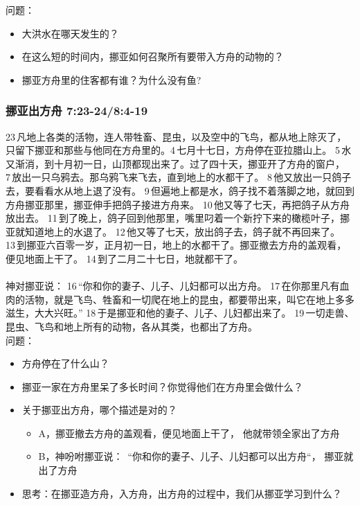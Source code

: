 问题：
\begin{itemize}
\item 大洪水在哪天发生的？
\item 在这么短的时间内，挪亚如何召聚所有要带入方舟的动物的？
\item  挪亚方舟里的住客都有谁？为什么没有鱼?
\end{itemize}

\newpage
\subsubsection{挪亚出方舟 7:23-24/8:4-19}
23 凡地上各类的活物，连人带牲畜、昆虫，以及空中的飞鸟，都从地上除灭了，只留下挪亚和那些与他同在方舟里的。4 七月十七日，方舟停在亚拉腊山上。 5 水又渐消，到十月初一日，山顶都现出来了。过了四十天，挪亚开了方舟的窗户， 7 放出一只乌鸦去。那乌鸦飞来飞去，直到地上的水都干了。 8 他又放出一只鸽子去，要看看水从地上退了没有。 9 但遍地上都是水，鸽子找不着落脚之地，就回到方舟挪亚那里，挪亚伸手把鸽子接进方舟来。 10 他又等了七天，再把鸽子从方舟放出去。 11 到了晚上，鸽子回到他那里，嘴里叼着一个新拧下来的橄榄叶子，挪亚就知道地上的水退了。 12 他又等了七天，放出鸽子去，鸽子就不再回来了。13 到挪亚六百零一岁，正月初一日，地上的水都干了。挪亚撤去方舟的盖观看，便见地面上干了。 14 到了二月二十七日，地就都干了。\\
\\
神对挪亚说： 16 “你和你的妻子、儿子、儿妇都可以出方舟。 17 在你那里凡有血肉的活物，就是飞鸟、牲畜和一切爬在地上的昆虫，都要带出来，叫它在地上多多滋生，大大兴旺。” 18 于是挪亚和他的妻子、儿子、儿妇都出来了。 19 一切走兽、昆虫、飞鸟和地上所有的动物，各从其类，也都出了方舟。\\

问题：
\begin{itemize}
\item 方舟停在了什么山？
\item 挪亚一家在方舟里呆了多长时间？你觉得他们在方舟里会做什么？
\item 关于挪亚出方舟，哪个描述是对的？
\begin{itemize}
\item A，挪亚撤去方舟的盖观看，便见地面上干了， 他就带领全家出了方舟
\item B，神吩咐挪亚说：  “你和你的妻子、儿子、儿妇都可以出方舟“， 挪亚就出了方舟
\end{itemize}
\item 思考：在挪亚造方舟，入方舟，出方舟的过程中，我们从挪亚学习到什么？
\end{itemize}


